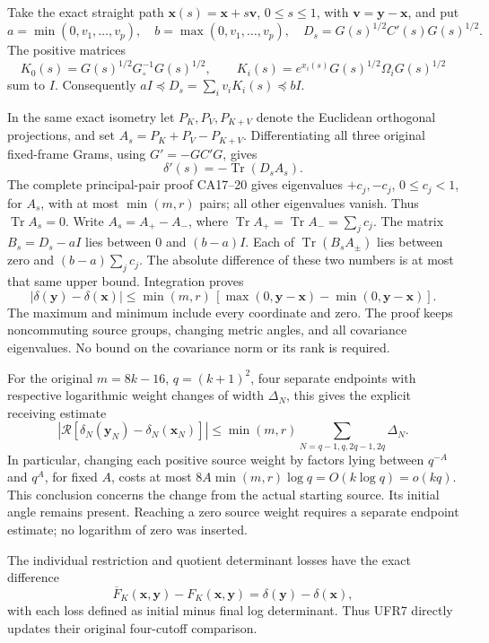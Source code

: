 \documentclass[11pt]{article}
\begin{document}
Take the exact straight path \(\mathbf x(s)=\mathbf x+s\mathbf v\), \(0\le s\le1\), with \(\mathbf v=\mathbf y-\mathbf x\), and put \[
a=\min(0,v_1,\ldots,v_p),\quad b=\max(0,v_1,\ldots,v_p),\quad
D_s=G(s)^{1/2}C'(s)G(s)^{1/2}.                                   \tag{UFR4}
\] The positive matrices \[
K_0(s)=G(s)^{1/2}G_\circ^{-1}G(s)^{1/2},\qquad
K_i(s)=e^{x_i(s)}G(s)^{1/2}\Omega_iG(s)^{1/2}
\] sum to \(I\). Consequently \(aI\preceq D_s=\sum_i v_iK_i(s)\preceq bI\).

In the same exact isometry let \(P_K,P_V,P_{K+V}\) denote the Euclidean orthogonal projections, and set \(A_s=P_K+P_V-P_{K+V}\). Differentiating all three original fixed-frame Grams, using \(G'=-GC'G\), gives \[
\delta'(s)=-\operatorname{Tr}(D_sA_s).                            \tag{UFR5}
\] The complete principal-pair proof CA17--20 gives eigenvalues \(+c_j,-c_j\), \(0\le c_j<1\), for \(A_s\), with at most \(\min(m,r)\) pairs; all other eigenvalues vanish. Thus \(\operatorname{Tr}A_s=0\). Write \(A_s=A_+-A_-\), where \(\operatorname{Tr}A_+=\operatorname{Tr}A_-=\sum_jc_j\). The matrix \(B_s=D_s-aI\) lies between \(0\) and \((b-a)I\). Each of \(\operatorname{Tr}(B_sA_\pm)\) lies between zero and \((b-a)\sum_jc_j\). The absolute difference of these two numbers is at most that same upper bound. Integration proves \[
\boxed{|\delta(\mathbf y)-\delta(\mathbf x)|
 \le \min(m,r)\,[\max(0,\mathbf y-\mathbf x)-\min(0,\mathbf y-\mathbf x)] .} \tag{UFR6}
\] The maximum and minimum include every coordinate and zero. The proof keeps noncommuting source groups, changing metric angles, and all covariance eigenvalues. No bound on the covariance norm or its rank is required.

For the original \(m=8k-16\), \(q=(k+1)^2\), four separate endpoints with respective logarithmic weight changes of width \(\Delta_N\), this gives the explicit receiving estimate \[
\left|\mathcal R[\delta_N(\mathbf y_N)-\delta_N(\mathbf x_N)]\right|
 \le \min(m,r)\sum_{N=q-1,q,2q-1,2q}\Delta_N.                      \tag{UFR7}
\] In particular, changing each positive source weight by factors lying between \(q^{-A}\) and \(q^A\), for fixed \(A\), costs at most \(8A\min(m,r)\log q=O(k\log q)=o(kq)\). This conclusion concerns the change from the actual starting source. Its initial angle remains present. Reaching a zero source weight requires a separate endpoint estimate; no logarithm of zero was inserted.

The individual restriction and quotient determinant losses have the exact difference \[
\overline F_K(\mathbf x,\mathbf y)-F_K(\mathbf x,\mathbf y)
=\delta(\mathbf y)-\delta(\mathbf x),                             \tag{UFR8}
\] with each loss defined as initial minus final log determinant. Thus UFR7 directly updates their original four-cutoff comparison.
\end{document}
